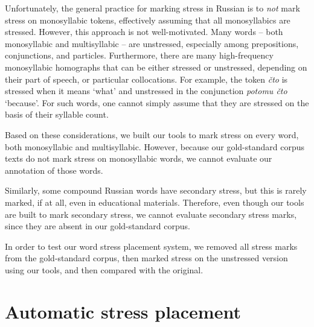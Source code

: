\documentclass[11pt]{article}
\newcommand{\rus}[1]{\foreignlanguage{russian}{#1}}
\newcommand{\rr}[1]{\marginpar{\scriptsize R: #1}} %
\begin{document}
Unfortunately, the general practice for marking stress in Russian is to
\emph{not} mark stress on monosyllabic tokens, effectively assuming that
all monosyllabics are stressed. However, this approach 
is not well-motivated. Many words -- both monosyllabic and multisyllabic -- are 
unstressed, especially among prepositions, conjunctions, and particles.
Furthermore, there are many
high-frequency monosyllabic homographs that can be either stressed or unstressed, 
depending on their part of speech, or particular collocations. For example,
the token \emph{čto} is stressed when it means `what' and unstressed in the
conjunction \emph{potomu čto} `because'. For such words, one cannot simply
assume that they are stressed on the basis of their syllable count.

Based on these considerations, we built our tools to mark stress on every
word, both monosyllabic and multisyllabic. However, because our gold-standard corpus texts 
do not mark stress on monosyllabic words, we cannot evaluate our annotation of 
those words.

Similarly, some compound Russian words have secondary stress, but this is rarely 
marked, if at all, even in educational materials. Therefore, even though our 
tools are built to mark secondary stress, we cannot evaluate secondary stress
marks, since they are absent in our gold-standard corpus.

In order to test our word stress placement system, we removed all stress marks
from the gold-standard corpus, then marked stress on the unstressed version using our tools, and then
compared with the original.

\section{Automatic stress placement}
\end{document}
